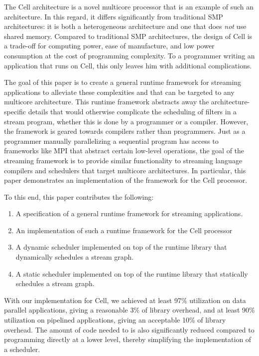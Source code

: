 The Cell architecture is a novel multicore processor that is an example of such an architecture. In this regard, it differs significantly from traditional SMP architectures: it is both a heterogeneous architecture and one that does \emph{not} use shared memory. Compared to traditional SMP architectures, the design of Cell is a trade-off for computing power, ease of manufacture, and low power consumption at the cost of programming complexity. To a programmer writing an application that runs on Cell, this only leaves him with additional complications.

The goal of this paper is to create a general runtime framework for streaming applications to alleviate these complexities and that can be targeted to any multicore architecture. This runtime framework abstracts away the architecture-specific details that would otherwise complicate the scheduling of filters in a stream program, whether this is done by a programmer or a compiler. However, the framework is geared towards compilers rather than programmers. Just as a programmer manually parallelizing a sequential program has access to frameworks like MPI that abstract certain low-level operations, the goal of the streaming framework is to provide similar functionality to streaming language compilers and schedulers that target multicore architectures. In particular, this paper demonstrates an implementation of the framework for the Cell processor.

To this end, this paper contributes the following:
\begin{enumerate}
\item A specification of a general runtime framework for streaming applications.
\item An implementation of such a runtime framework for the Cell processor
\item A dynamic scheduler implemented on top of the runtime library that dynamically schedules a stream graph.
\item A static scheduler implemented on top of the runtime library that statically schedules a stream graph.
\end{enumerate}

With our implementation for Cell, we achieved at least 97\% utilization on data parallel applications, giving a reasonable 3\% of library overhead, and at least 90\% utilization on pipelined applications, giving an acceptable 10\% of library overhead. The amount of code needed to is also significantly reduced compared to programming directly at a lower level, thereby simplifying the implementation of a scheduler.

